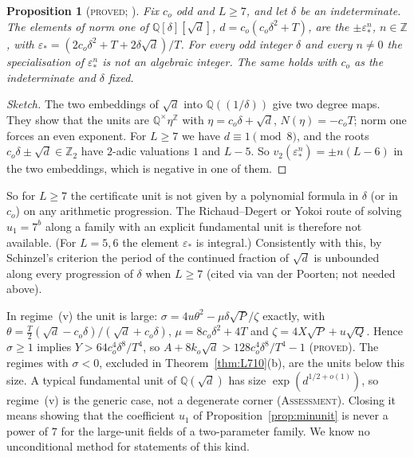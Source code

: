 \documentclass[11pt,reqno]{amsart}
\newtheorem{proposition}[theorem]{Proposition}
\theoremstyle{definition}
\newcommand{\Z}{\mathbb Z}
\newcommand{\Q}{\mathbb Q}
\newcommand{\status}[1]{\textup{\textsc{#1}}}
\begin{document}
\begin{proposition}[\status{proved}; {\cite[Prop.~2.1]{PT6}}]\label{prop:nopoly}
Fix $c_o$ odd and $L\ge7$, and let $\delta$ be an indeterminate.  The
elements of norm one of $\Q[\delta][\sqrt d]$, $d=c_o(c_o\delta^2+T)$, are
the $\pm\varepsilon_*^n$, $n\in\Z$, with
$\varepsilon_*=(2c_o\delta^2+T+2\delta\sqrt d)/T$.  For every odd integer
$\delta$ and every $n\ne0$ the specialisation of $\varepsilon_*^n$ is not an
algebraic integer.  The same holds with $c_o$ as the indeterminate and
$\delta$ fixed.
\end{proposition}

\begin{proof}[Sketch]
The two embeddings of $\sqrt d$ into $\Q((1/\delta))$ give two degree maps.
They show that the units are $\Q^\times\eta^{\Z}$ with
$\eta=c_o\delta+\sqrt d$, $N(\eta)=-c_oT$; norm one forces an even
exponent.  For $L\ge7$ we have $d\equiv1\pmod8$, and the roots
$c_o\delta\pm\sqrt d\in\Z_2$ have $2$-adic valuations $1$ and $L-5$.  So
$v_2(\varepsilon_*^n)=\pm n(L-6)$ in the two embeddings, which is negative
in one of them.
\end{proof}

So for $L\ge7$ the certificate unit is not given by a polynomial formula
in $\delta$ (or in $c_o$) on any arithmetic progression.  The
Richaud--Degert or Yokoi route of solving $u_1=7^b$ along a family with
an explicit fundamental unit is therefore not available.  (For
$L=5,6$ the element $\varepsilon_*$ is integral.)  Consistently with this,
by Schinzel's criterion the period of the continued fraction of $\sqrt d$
is unbounded along every progression of $\delta$ when $L\ge7$
\cite[Prop.~2.1(c)]{PT6} (cited via van der Poorten; not needed above).

In regime~(v) the unit is large: $\sigma=4u\theta^2-\mu\delta\sqrt P/\zeta$
exactly, with $\theta=\tfrac T2(\sqrt d-c_o\delta)/(\sqrt d+c_o\delta)$,
$\mu=8c_o\delta^2+4T$ and $\zeta=4X\sqrt P+u\sqrt Q$.  Hence $\sigma\ge1$
implies $Y>64c_o^4\delta^8/T^4$, so $A+8k_o\sqrt d>128c_o^4\delta^8/T^4-1$
\cite[Lemma~3.1]{PT6} (\status{proved}).  The regimes with $\sigma<0$,
excluded in Theorem~\ref{thm:L710}(b), are the units below this size.  A typical fundamental unit of
$\Q(\sqrt d)$ has size $\exp(d^{1/2+o(1)})$, so regime~(v) is the generic
case, not a degenerate corner (\status{Assessment}).  Closing it means
showing that the coefficient $u_1$ of
Proposition~\ref{prop:minunit} is never a power of $7$ for the large-unit
fields of a two-parameter family.  We know no unconditional method for
statements of this kind.
\end{document}
